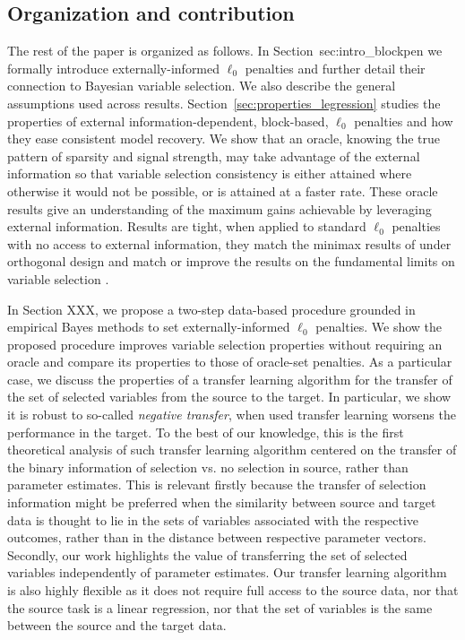 \documentclass{article}
\begin{document}
\subsection{Organization and contribution}
The rest of the paper is organized as follows. In Section~{sec:intro_blockpen} we formally introduce externally-informed $\ell_0$ penalties and further detail their connection to Bayesian variable selection. We also describe the general assumptions used across results. Section~\ref{sec:properties_legression} studies the properties of external information-dependent, block-based, $\ell_0$ penalties and how they ease consistent model recovery. We show that an oracle, knowing the true pattern of sparsity and signal strength, may take advantage of the external information so that variable selection consistency is either attained where otherwise it would not be possible, or is attained at a faster rate. These oracle results give an understanding of the maximum gains achievable by leveraging external information. Results are tight, when applied to standard $\ell_0$ penalties with no access to external information, they match the minimax results of \cite{Bunea2007} under orthogonal design and match or improve the results on the fundamental limits on variable selection \cite{infotheowainwright, wang2010, bryon}. 

In Section XXX, we propose a two-step data-based procedure grounded in empirical Bayes methods to set externally-informed $\ell_0$ penalties. We show the proposed procedure improves variable selection properties without requiring an oracle and compare its properties to those of oracle-set penalties. As a particular case, we discuss the properties of a transfer learning algorithm for the transfer of the set of selected variables from the source to the target. In particular, we show it is robust to so-called \textit{negative transfer}, when used transfer learning worsens the performance in the target. To the best of our knowledge, this is the first theoretical analysis of such transfer learning algorithm centered on the transfer of the binary information of selection vs. no selection in source, rather than parameter estimates. This is relevant firstly because the transfer of selection information might be preferred when the similarity between source and target data is thought to lie in the sets of variables associated with the respective outcomes, rather than in the distance between respective parameter vectors. Secondly, our work highlights the value of transferring the set of selected variables independently of parameter estimates. Our transfer learning algorithm is also highly flexible as it does not require full access to the source data, nor that the source task is a linear regression, nor that the set of variables is the same between the source and the target data.
\end{document}
